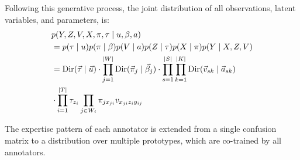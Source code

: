 \documentclass[letterpaper]{article} %
\begin{document}
Following this generative process, the joint distribution of all observations, latent variables, and parameters, is:
\begin{align}
  &p(Y, Z, V, X, \pi, \tau \mid u, \beta, a) \notag\\
  &=p(\tau\mid u)p(\pi\mid\beta)p(V\mid a)p(Z\mid\tau)p(X\mid\pi)p(Y\mid X,Z,V) \notag\\
  &=\text{Dir}(\vec{\tau} \mid \vec{u})\cdot \prod_{j=1}^{|W|}\text{Dir}(\vec{\pi}_{j} \mid \vec{\beta}_{j})\cdot\prod_{s=1}^{|S|}\prod_{k=1}^{|K|}\text{Dir}(\vec{v}_{sk} \mid\vec{a}_{sk}) \notag\\
  &\cdot\prod_{i=1}^{|T|}\tau_{z_{i}}\prod_{j\in W_{i}}\pi_{jx_{ji}}v_{x_{ji}z_{i}y_{ij}}
  \label{pf1}
\end{align}

The expertise pattern of each annotator is extended from a single confusion matrix to a distribution over multiple prototypes, which are co-trained by all annotators.
\end{document}
